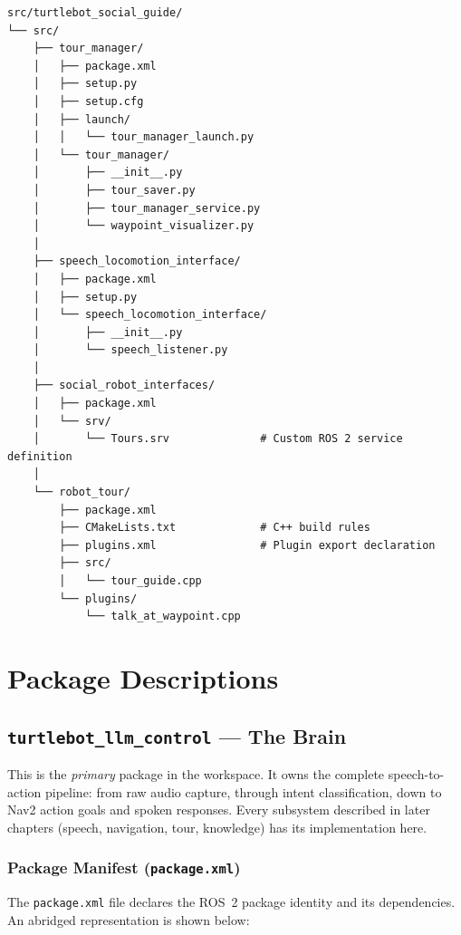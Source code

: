 \documentclass[12pt,a4paper]{report}
\newcommand{\file}[1]{\texttt{\color{black!70}#1}}
\begin{document}
\begin{lstlisting}[style=bashstyle, caption={\texttt{turtlebot\_social\_guide} internal layout}]
src/turtlebot_social_guide/
└── src/
    ├── tour_manager/
    │   ├── package.xml
    │   ├── setup.py
    │   ├── setup.cfg
    │   ├── launch/
    │   │   └── tour_manager_launch.py
    │   └── tour_manager/
    │       ├── __init__.py
    │       ├── tour_saver.py
    │       ├── tour_manager_service.py
    │       └── waypoint_visualizer.py
    │
    ├── speech_locomotion_interface/
    │   ├── package.xml
    │   ├── setup.py
    │   └── speech_locomotion_interface/
    │       ├── __init__.py
    │       └── speech_listener.py
    │
    ├── social_robot_interfaces/
    │   ├── package.xml
    │   └── srv/
    │       └── Tours.srv              # Custom ROS 2 service definition
    │
    └── robot_tour/
        ├── package.xml
        ├── CMakeLists.txt             # C++ build rules
        ├── plugins.xml                # Plugin export declaration
        ├── src/
        │   └── tour_guide.cpp
        └── plugins/
            └── talk_at_waypoint.cpp
\end{lstlisting}

\chapter{Package Descriptions}
\label{ch:packages}

\section{\texttt{turtlebot\_llm\_control} — The Brain}
\label{sec:llm_control}

This is the \emph{primary} package in the workspace.  It owns the complete
speech-to-action pipeline: from raw audio capture, through intent
classification, down to Nav2 action goals and spoken responses.  Every
subsystem described in later chapters (speech, navigation, tour, knowledge) has
its implementation here.

\subsection{Package Manifest (\texttt{package.xml})}

The \file{package.xml} file declares the ROS~2 package identity and its
dependencies.  An abridged representation is shown below:
\end{document}
